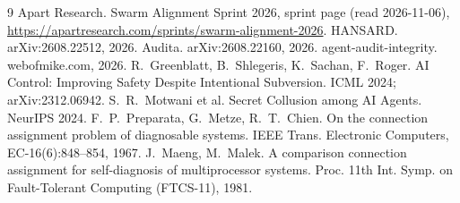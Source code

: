 \documentclass[10pt]{article}
\begin{document}
\begin{thebibliography}{9}
 Apart Research. Swarm Alignment Sprint 2026, sprint page (read 2026-11-06),
  \url{https://apartresearch.com/sprints/swarm-alignment-2026}.
 HANSARD. arXiv:2608.22512, 2026.
 Audita. arXiv:2608.22160, 2026.
 agent-audit-integrity. webofmike.com, 2026.
 R.~Greenblatt, B.~Shlegeris, K.~Sachan, F.~Roger. AI Control: Improving Safety Despite
  Intentional Subversion. ICML 2024; arXiv:2312.06942.
 S.~R.~Motwani et al. Secret Collusion among AI Agents. NeurIPS 2024.
 F.~P.~Preparata, G.~Metze, R.~T.~Chien. On the connection assignment problem of diagnosable
  systems. IEEE Trans. Electronic Computers, EC-16(6):848--854, 1967.
 J.~Maeng, M.~Malek. A comparison connection assignment for self-diagnosis of
  multiprocessor systems. Proc. 11th Int. Symp. on Fault-Tolerant Computing (FTCS-11), 1981.
\end{thebibliography}
\end{document}
